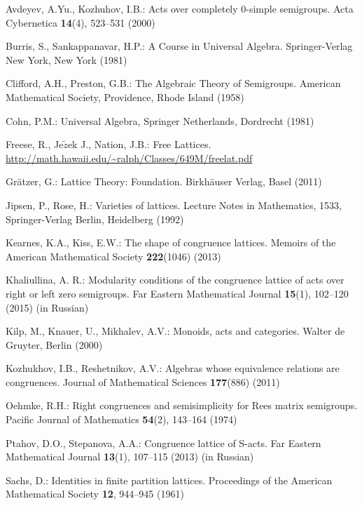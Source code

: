 \documentclass{birkau}
\numberwithin{equation}{section}
\theoremstyle{plain}
\theoremstyle{definition}
\begin{document}
	\begin{thebibliography}{99}

         Avdeyev, A.Yu., Kozhuhov, I.B.:
        Acts over completely 0-simple semigroups.
        Acta Cybernetica \textbf{14}(4), 523--531 (2000)

         Burris, S., Sankappanavar, H.P.: A Course in Universal Algebra. Springer-Verlag New York, New York (1981)

        Clifford, A.H., Preston, G.B.:
        The Algebraic Theory of Semigroups.
        American  Mathematical  Society,  Providence, Rhode  Island (1958)

        Cohn, P.M.:
        Universal Algebra,
        Springer Netherlands, Dordrecht (1981)

        Freese, R., Je$\tilde{z}$ek J., Nation, J.B.:
        Free Lattices.
        \url{http://math.hawaii.edu/~ralph/Classes/649M/freelat.pdf}

        Gr\"atzer, G.:
        Lattice Theory: Foundation.
        Birkh\"auser Verlag, Basel (2011)

         Jipsen, P., Rose, H.: Varieties of lattices. Lecture Notes in Mathematics, 1533, Springer-Verlag Berlin, Heidelberg (1992)

         Kearnes, K.A., Kiss, E.W.: The shape of congruence lattices. Memoirs of the American Mathematical Society \textbf{222}(1046) (2013)

        Khaliullina, A. R.:
        Modularity conditions of the congruence lattice of acts over right or left zero semigroups.
        Far Eastern Mathematical Journal \textbf{15}(1), 102--120 (2015) (in Russian)

        Kilp, M., Knauer, U., Mikhalev, A.V.:
        Monoids, acts and categories. Walter de Gruyter, Berlin (2000)

        Kozhukhov, I.B., Reshetnikov, A.V.:
        Algebras whose equivalence relations are congruences.
        Journal of Mathematical Sciences \textbf{177}(886) (2011)

        Oehmke, R.H.:
        Right congruences and semisimplicity for Rees matrix semigroups.
        Pacific Journal of Mathematics \textbf{54}(2), 143--164 (1974)

        Ptahov, D.O., Stepanova, A.A.:
        Congruence lattice of S-acts.
        Far Eastern Mathematical Journal
        \textbf{13}(1), 107--115 (2013) (in Russian)

        Sachs, D.:
        Identities in finite partition lattices.
        Proceedings of the American Mathematical Society
        \textbf{12}, 944--945 (1961)
	
	\end{thebibliography}
	
\end{document}
